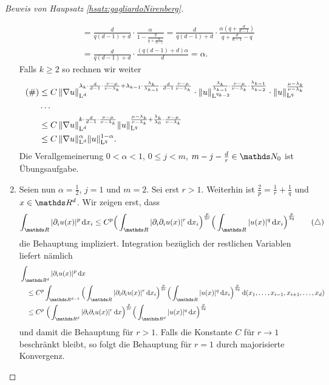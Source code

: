 \begin{proof}[Beweis von Haupsatz \ref{hsatz:gagliardoNirenberg}]
\begin{enumerate}
\begin{align*}
        &= \frac{d}{q(d - 1) + d} \cdot \frac{\alpha}{1 - \frac{q}{q + \frac{d}{d - 1}}} 
        = \frac{d}{q(d - 1) + d} \cdot \frac{\alpha (q + \frac{d}{d - 1})}{q + \frac{d}{d - 1} - q} \\
        &= \frac{d}{q(d - 1) + d} \cdot \frac{(q(d - 1) + d) \alpha}{d} 
        = \alpha.
      \end{align*}
      Falls $k \geq 2$ so rechnen wir weiter
      \begin{align*}
        (\#) 
        &\leq C\, \|\nabla u\|_{\mathrm{L}^d}^{\lambda_k \cdot \frac{d}{d - 1} \cdot \frac{\nu - \mu}{\nu - \lambda_k} + \lambda_{k - 1} \cdot \frac{\lambda_k}{\lambda_{k - 1}} \cdot \frac{d}{d - 1} \frac{\nu - \mu}{\nu - \lambda_k}}
        \cdot \| u\|_{\mathrm{L}^{q_{k - 2}}}^{\frac{\lambda_k}{\lambda_{k - 1}} \cdot \frac{\nu - \mu}{\nu - \lambda_k} \cdot \frac{\lambda_{k - 1}}{\lambda_{k - 2}}} 
        \cdot \|u\|_{\mathrm{L}^q}^{\frac{\mu - \lambda_k}{\nu - \lambda_k}} \\
        &\dots \\
        &\leq C \, \|\nabla u\|_{\mathrm{L}^d}^{k \cdot \frac{d}{d - 1} \cdot \frac{\nu - \mu}{\nu - \lambda_k}} \|u\|_{\mathrm{L}^q}^{\frac{\mu - \lambda_k}{\nu - \lambda_k} + \frac{\lambda_k}{\lambda_0} \cdot \frac{\nu - \mu}{\nu - \lambda_k}} \\
        &\leq C \, \|\nabla u\|_{\mathrm{L}^d}^{\alpha} \|u\|_{\mathrm{L}^q}^{1 - \alpha}.
      \end{align*}
      Die Verallgemeinerung $0 < \alpha < 1$, $0 \leq j < m$, $m - j - \frac{d}{r} \in \N_0$ ist Übungsaufgabe.
    \item
      Seien nun $\alpha = \frac{1}{2}$, $j = 1$ und $m = 2$.
      Sei erst $r > 1$.
      Weiterhin ist $\frac{2}{p} = \frac{1}{r} + \frac{1}{q}$ und $x \in \R^d$.
      Wir zeigen erst, dass
      \begin{align*}
        \int_{\R} |\partial_i u(x)|^p \d x_i 
        \leq C^p \Big( \int_{\R} |\partial_i \partial_i u(x)|^r \d x_i \Big)^{\frac{p}{2r}} \Big(\int_{\R} |u(x)|^q \d x_i \Big)^{\frac{p}{2q}}
        \tag{$\triangle$}
      \end{align*}
      die Behauptung impliziert.
      Integration bezüglich der restlichen Variablen liefert nämlich
      \begin{align*}
        &\int_{\R^d} |\partial_i u(x)|^p \d x \\
        &\quad\leq C^p \int_{\R^{d - 1}} \Big( \int_{\R} |\partial_i \partial_i u(x)|^r \d x_i \Big)^{\frac{p}{2r}} \Big(\int_{\R} |u(x)|^q \d x_i \Big)^{\frac{p}{2q}} \d (x_1,\dots,x_{i - 1}, x_{i + 1}, \dots, x_d ) \\
        &\quad\leq C^p \; \Big( \int_{\R^d} |\partial_i \partial_i u(x)|^r \d x \Big)^{\frac{p}{2r}} \Big( \int_{\R^d} |u(x)|^q \d x \Big)^{\frac{p}{2q}}
      \end{align*}
      und damit die Behauptung für $r > 1$.
      Falls die Konstante $C$ für $r \to 1$ beschränkt bleibt, so folgt die Behauptung für $r = 1$ durch majorisierte Konvergenz.


\end{enumerate}
\end{proof}
